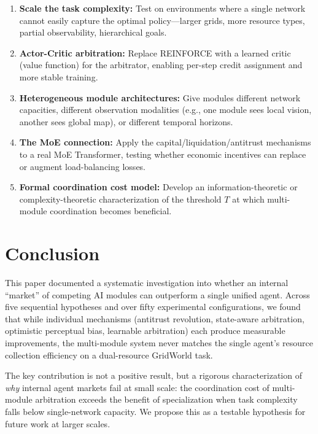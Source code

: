 \documentclass[a4paper,11pt]{article}
\begin{document}
\begin{enumerate}[itemsep=2pt]
    \item \textbf{Scale the task complexity:} Test on environments where a single network cannot easily capture the optimal policy---larger grids, more resource types, partial observability, hierarchical goals.
    \item \textbf{Actor-Critic arbitration:} Replace REINFORCE with a learned critic (value function) for the arbitrator, enabling per-step credit assignment and more stable training.
    \item \textbf{Heterogeneous module architectures:} Give modules different network capacities, different observation modalities (e.g., one module sees local vision, another sees global map), or different temporal horizons.
    \item \textbf{The MoE connection:} Apply the capital/liquidation/antitrust mechanisms to a real MoE Transformer, testing whether economic incentives can replace or augment load-balancing losses.
    \item \textbf{Formal coordination cost model:} Develop an information-theoretic or complexity-theoretic characterization of the threshold $T$ at which multi-module coordination becomes beneficial.
\end{enumerate}

\section{Conclusion}

This paper documented a systematic investigation into whether an internal ``market'' of competing AI modules can outperform a single unified agent. Across five sequential hypotheses and over fifty experimental configurations, we found that while individual mechanisms (antitrust revolution, state-aware arbitration, optimistic perceptual bias, learnable arbitration) each produce measurable improvements, the multi-module system never matches the single agent's resource collection efficiency on a dual-resource GridWorld task.

The key contribution is not a positive result, but a rigorous characterization of \textit{why} internal agent markets fail at small scale: the coordination cost of multi-module arbitration exceeds the benefit of specialization when task complexity falls below single-network capacity. We propose this as a testable hypothesis for future work at larger scales.
\end{document}
